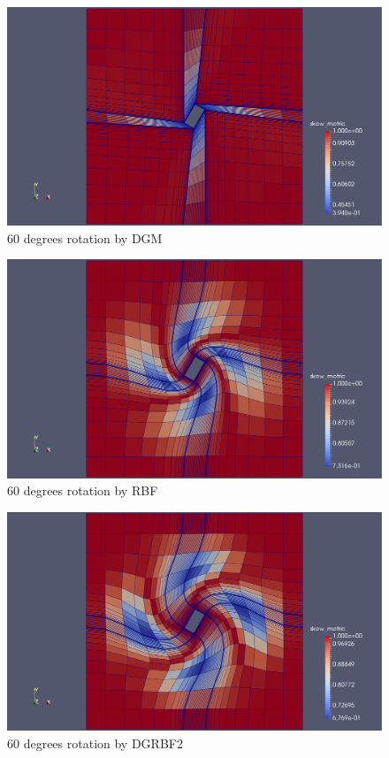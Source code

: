 \documentclass[letterpaper,11pt]{article}
\begin{document}
\begin{figure}
	\centering
	\includegraphics[scale=0.25]{qin-60-dgm-quality.pdf}
	\caption{60 degrees rotation by DGM}
	\label{fig:qin-60-dgm}
\end{figure}

\begin{figure}
	\centering
	\includegraphics[scale=0.25]{qin-60-rbf-quality.pdf}
	\caption{60 degrees rotation by RBF}
	\label{fig:qin-60-rbf}
\end{figure}

\begin{figure}
	\centering
	\includegraphics[scale=0.25]{qin-60-dgrbf2-quality.pdf}
	\caption{60 degrees rotation by DGRBF2}
	\label{fig:qin-60-dgrbf2}
\end{figure}
\end{document}
